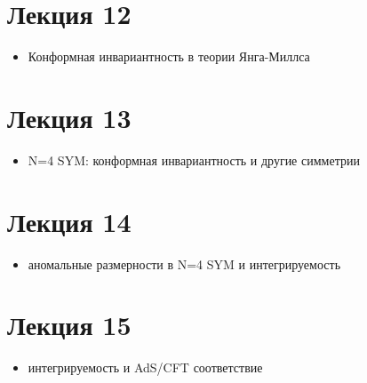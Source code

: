 \documentclass[a4paper,12pt]{article}
\theoremstyle{definition}
\theoremstyle{definition}
\theoremstyle{definition}
\begin{document}
\section{Лекция 12}
  \begin{itemize}
  \item Конформная инвариантность в теории Янга-Миллса
  \end{itemize}
\section{Лекция 13}
  \begin{itemize}
  \item N=4 SYM: конформная инвариантность и другие симметрии
  \end{itemize}
\section{Лекция 14}
  \begin{itemize}
  \item аномальные размерности в N=4 SYM и интегрируемость
  \end{itemize}

\section{Лекция 15}
  \begin{itemize}
  \item интегрируемость и AdS/CFT соответствие
  \end{itemize}

{}

\end{document}
